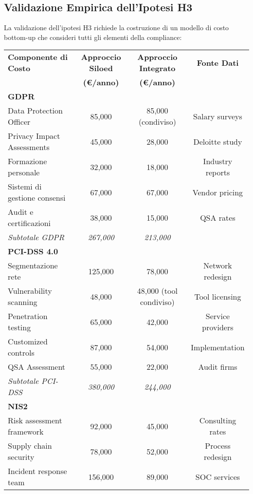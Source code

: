 \subsection{Validazione Empirica dell'Ipotesi H3}

La validazione dell'ipotesi H3 richiede la costruzione di un modello di costo bottom-up che consideri tutti gli elementi della compliance:

\begin{table}[H]
\centering
\begin{tabular}{lccc}
\toprule
\textbf{Componente di Costo} & \textbf{Approccio Siloed} & \textbf{Approccio Integrato} & \textbf{Fonte Dati} \\
 & \textbf{(€/anno)} & \textbf{(€/anno)} & \\
\midrule
\multicolumn{4}{l}{\textbf{GDPR}} \\
Data Protection Officer & 85,000 & 85,000 (condiviso) & Salary surveys \\
Privacy Impact Assessments & 45,000 & 28,000 & Deloitte study \\
Formazione personale & 32,000 & 18,000 & Industry reports \\
Sistemi di gestione consensi & 67,000 & 67,000 & Vendor pricing \\
Audit e certificazioni & 38,000 & 15,000 & QSA rates \\
\textit{Subtotale GDPR} & \textit{267,000} & \textit{213,000} & \\
\midrule
\multicolumn{4}{l}{\textbf{PCI-DSS 4.0}} \\
Segmentazione rete & 125,000 & 78,000 & Network redesign \\
Vulnerability scanning & 48,000 & 48,000 (tool condiviso) & Tool licensing \\
Penetration testing & 65,000 & 42,000 & Service providers \\
Customized controls & 87,000 & 54,000 & Implementation \\
QSA Assessment & 55,000 & 22,000 & Audit firms \\
\textit{Subtotale PCI-DSS} & \textit{380,000} & \textit{244,000} & \\
\midrule
\multicolumn{4}{l}{\textbf{NIS2}} \\
Risk assessment framework & 92,000 & 45,000 & Consulting rates \\
Supply chain security & 78,000 & 52,000 & Process redesign \\
Incident response team & 156,000 & 89,000 & SOC services \\

\end{tabular}
\end{table}
